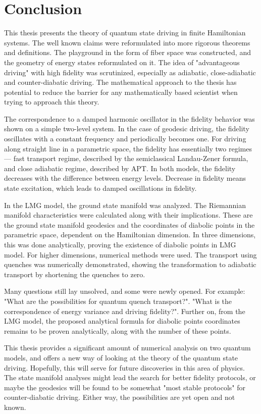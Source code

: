 \chapter*{Conclusion}
This thesis presents the theory of quantum state driving in finite Hamiltonian systems. The well known claims were reformulated into more rigorous theorems and definitions. The playground in the form of fiber space was constructed, and the geometry of energy states reformulated on it. The idea of "advantageous driving" with high fidelity was scrutinized, especially as adiabatic, close-adiabatic and counter-diabatic driving. The mathematical approach to the thesis has potential to reduce the barrier for any mathematically based scientist when trying to approach this theory. 

The correspondence to a damped harmonic oscillator in the fidelity behavior was shown on a simple two-level system. In the case of geodesic driving, the fidelity oscillates with a constant frequency and periodically becomes one. For driving along straight line in a parametric space, the fidelity has essentially two regimes — fast transport regime, described by the semiclassical Landau-Zener formula, and close adiabatic regime, described by APT. In both models, the fidelity decreases with the difference between energy levels. Decrease in fidelity means state excitation, which leads to damped oscillations in fidelity.

In the LMG model, the ground state manifold was analyzed. The Riemannian manifold characteristics were calculated along with their implications. These are the ground state manifold geodesics and the coordinates of diabolic points in the parametric space, dependent on the Hamiltonian dimension. In three dimensions, this was done analytically, proving the existence of diabolic points in LMG model. For higher dimensions, numerical methods were used. The transport using quenches was numerically demonstrated, showing the transformation to adiabatic transport by shortening the quenches to zero.

Many questions still lay unsolved, and some were newly opened. For example: "What are the possibilities for quantum quench transport?". "What is the correspondence of energy variance and driving fidelity?". Further on, from the LMG model, the proposed analytical formula for diabolic points coordinates remains to be proven analytically, along with the number of these points.

This thesis provides a significant amount of numerical analysis on two quantum models, and offers a new way of looking at the theory of the quantum state driving. Hopefully, this will serve for future discoveries in this area of physics. The state manifold analyses might lead the search for better fidelity protocols, or maybe the geodesics will be found to be somewhat "most stable protocols" for counter-diabatic driving. Either way, the possibilities are yet open and not known.